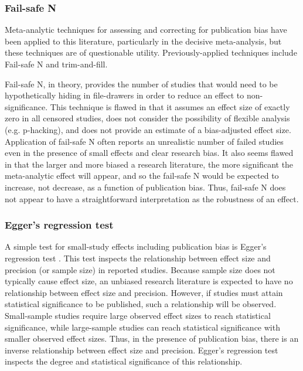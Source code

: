 \documentclass[man]{apa6}
\begin{document}
\subsubsection{Fail-safe N}
Meta-analytic techniques for assessing and correcting for publication bias have been applied to this literature, particularly in the decisive \citet{Anderson:etal:2010} meta-analysis, but these techniques are of questionable utility. Previously-applied techniques include Fail-safe N and trim-and-fill.

Fail-safe N, in theory, provides the number of studies %
that would need to be hypothetically hiding in file-drawers in order to reduce an effect to non-significance. This technique is flawed in that it assumes an effect size of exactly zero in all censored studies, does not consider the possibility of flexible analysis (e.g. p-hacking), and does not provide an estimate of a bias-adjusted effect size. Application of fail-safe N often reports an unrealistic number of failed studies even in the presence of small effects and clear research bias. %
It also seems flawed in that the larger and more biased a research literature, the more significant the meta-analytic effect will appear, and so the fail-safe N would be expected to increase, not decrease, as a function of publication bias. Thus, fail-safe N does not appear to have a straightforward interpretation as the robustness of an effect.

\subsubsection{Egger's regression test}
A simple test for small-study effects including publication bias is Egger's regression test \citep{Egger:1997}. This test inspects the relationship between effect size and precision (or sample size) in reported studies. Because sample size does not typically cause effect size, an unbiased research literature is expected to have no relationship between effect size and precision. However, if studies must attain statistical significance to be published, such a relationship will be observed. Small-sample studies require large observed effect sizes to reach statistical significance, while large-sample studies can reach statistical significance with smaller observed effect sizes. Thus, in the presence of publication bias, there is an inverse relationship between effect size and precision. Egger's regression test inspects the degree and statistical significance of this relationship.
\end{document}
